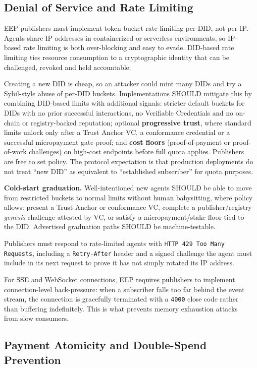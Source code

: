 \documentclass[12pt,a4paper]{article}
\begin{document}
\subsection{Denial of Service and Rate Limiting}

EEP publishers must implement token-bucket rate limiting per DID, not per IP. Agents share IP addresses in containerized or serverless environments, so IP-based rate limiting is both over-blocking and easy to evade. DID-based rate limiting ties resource consumption to a cryptographic identity that can be challenged, revoked and held accountable.

Creating a new DID is cheap, so an attacker could mint many DIDs and try a Sybil-style abuse of per-DID buckets. Implementations SHOULD mitigate this by combining DID-based limits with additional signals: stricter default buckets for DIDs with no prior successful interactions, no Verifiable Credentials and no on-chain or registry-backed reputation; optional \textbf{progressive trust}, where standard limits unlock only after a Trust Anchor VC, a conformance credential or a successful micropayment gate proof; and \textbf{cost floors} (proof-of-payment or proof-of-work challenges) on high-cost endpoints before full quota applies. Publishers are free to set policy. The protocol expectation is that production deployments do not treat ``new DID'' as equivalent to ``established subscriber'' for quota purposes.

\textbf{Cold-start graduation.} Well-intentioned new agents SHOULD be able to move from restricted buckets to normal limits without human babysitting, where policy allows: present a Trust Anchor or conformance VC, complete a publisher/registry \emph{genesis} challenge attested by VC, or satisfy a micropayment/stake floor tied to the DID. Advertised graduation paths SHOULD be machine-testable.

Publishers must respond to rate-limited agents with \texttt{HTTP 429 Too Many Requests}, including a \texttt{Retry-After} header and a signed challenge the agent must include in its next request to prove it has not simply rotated its IP address.

For SSE and WebSocket connections, EEP requires publishers to implement connection-level back-pressure: when a subscriber falls too far behind the event stream, the connection is gracefully terminated with a \texttt{4000} close code rather than buffering indefinitely. This is what prevents memory exhaustion attacks from slow consumers.

\subsection{Payment Atomicity and Double-Spend Prevention}
\end{document}

